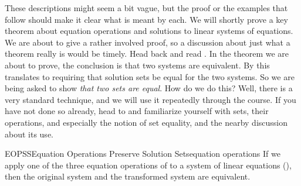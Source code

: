 %
These descriptions might seem a bit vague, but the proof or the examples that follow should make it clear what is meant by each.  We will shortly prove a key theorem about equation operations and solutions to linear systems of equations.
%
{We are about to give a rather involved proof, so a discussion about just what a theorem really is would be timely.}
{Head back and read .}
%
In the theorem we are about to prove, the conclusion is that two systems are equivalent.  By  this translates to requiring that solution sets be equal for the two systems.  So we are being asked to show {\em that two sets are equal}.  How do we do this?  Well, there is a very standard technique, and we will use it repeatedly through the course.  If you have not done so already, head to  and familiarize yourself with sets, their operations, and especially the notion of set equality,  and the nearby discussion about its use.\par
%
%
\begin{theorem}{EOPSS}{Equation Operations Preserve Solution Sets}{equation operations}
If we apply one of the three equation operations of  to a system of linear equations  (), then the original system and the transformed system are equivalent.
\end{theorem}
%
